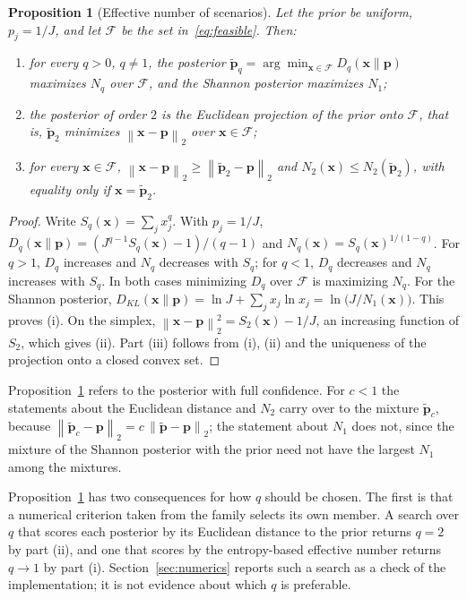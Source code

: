 \documentclass[11pt]{article}
\newtheorem{proposition}{Proposition}
\newcommand{\p}{\mathbf{p}}
\newcommand{\pt}{\tilde{\mathbf{p}}}
\newcommand{\x}{\mathbf{x}}
\newcommand{\norm}[1]{\left\lVert #1 \right\rVert}
\begin{document}
\begin{proposition}[Effective number of scenarios]\label{prop:hill}
Let the prior be uniform, $p_j = 1/J$, and let $\mathcal{F}$ be the set
in~\eqref{eq:feasible}. Then:
\begin{enumerate}
\item[(i)] for every $q>0$, $q \ne 1$, the posterior
      $\pt_q = \arg\min_{\x \in \mathcal{F}} D_q(\x\|\p)$ maximizes $N_q$
      over $\mathcal{F}$, and the Shannon posterior maximizes $N_1$;
\item[(ii)] the posterior of order $2$ is the Euclidean projection of the
      prior onto $\mathcal{F}$, that is,
      $\pt_2$ minimizes $\norm{\x - \p}_2$ over $\x \in \mathcal{F}$;
\item[(iii)] for every $\x \in \mathcal{F}$,
      $\norm{\x - \p}_2 \ge \norm{\pt_2 - \p}_2$ and
      $N_2(\x) \le N_2(\pt_2)$, with equality only if $\x = \pt_2$.
\end{enumerate}
\end{proposition}

\begin{proof}
Write $S_q(\x) = \sum_j x_j^q$. With $p_j = 1/J$,
$D_q(\x\|\p) = (J^{q-1} S_q(\x) - 1)/(q-1)$ and
$N_q(\x) = S_q(\x)^{1/(1-q)}$. For $q>1$, $D_q$ increases and $N_q$
decreases with $S_q$; for $q<1$, $D_q$ decreases and $N_q$ increases with
$S_q$. In both cases minimizing $D_q$ over $\mathcal{F}$ is maximizing
$N_q$. For the Shannon posterior,
$D_{KL}(\x\|\p) = \ln J + \sum_j x_j \ln x_j = \ln\big(J/N_1(\x)\big)$.
This proves (i). On the simplex,
$\norm{\x-\p}_2^2 = S_2(\x) - 1/J$, an increasing function of $S_2$, which
gives (ii). Part (iii) follows from (i), (ii) and the uniqueness of the
projection onto a closed convex set.
\end{proof}

Proposition~\ref{prop:hill} refers to the posterior with full confidence.
For $c<1$ the statements about the Euclidean distance and $N_2$ carry over
to the mixture $\pt_c$, because
$\norm{\pt_c - \p}_2 = c\,\norm{\pt - \p}_2$; the statement about $N_1$
does not, since the mixture of the Shannon posterior with the prior need
not have the largest $N_1$ among the mixtures.

Proposition~\ref{prop:hill} has two consequences for how $q$ should be
chosen. The first is that a numerical criterion taken from the family
selects its own member. A search over $q$ that scores each posterior by its
Euclidean distance to the prior returns $q=2$ by part (ii), and one that
scores by the entropy-based effective number returns $q \to 1$ by part (i).
Section~\ref{sec:numerics} reports such a search as a check of the
implementation; it is not evidence about which $q$ is preferable.
\end{document}
